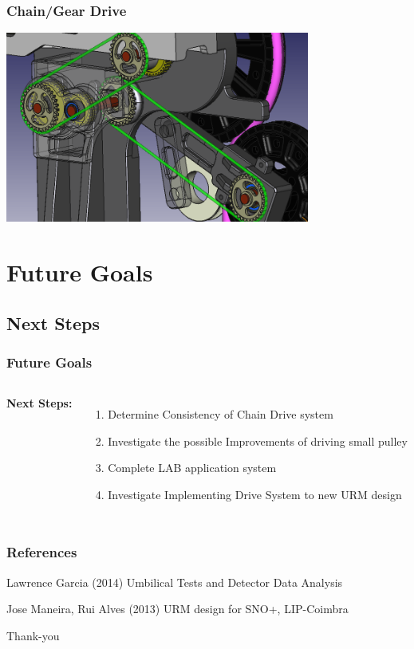 \documentclass{beamer}
\begin{document}
\begin{frame}
\frametitle{Chain/Gear Drive}
\centering
\includegraphics[width=10cm]{URM2.png}
\end{frame}

\section{Future Goals}
\subsection{Next Steps}

\begin{frame}
\frametitle{Future Goals}
\begin{columns}[t] %

\textbf{Next Steps:}
\begin{enumerate}
\item Determine Consistency of Chain Drive system
\item Investigate the possible Improvements of driving small pulley
\item Complete LAB application system
\item Investigate Implementing Drive System to new URM design
\end{enumerate}



\end{columns}

\end{frame}



\begin{frame}
\frametitle{References}
\footnotesize{
\begin{thebibliography}{99} %
 Lawrence Garcia (2014)
\newblock Umbilical Tests and Detector Data Analysis


 Jose Maneira, Rui Alves (2013)
\newblock URM design for SNO+, LIP-Coimbra

\end{thebibliography}
}
\end{frame}


\begin{frame}
\Huge{\centerline{Thank-you}}
\end{frame}

\end{document}
